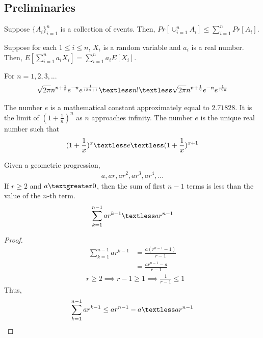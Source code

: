 \subsection{Preliminaries}
\begin{lemma}\label{union}
Suppose $\{A_i\}_{i=1}^n$ is a collection of events. Then, $Pr[\cup_{i=1}^{n}A_i]\le\sum_{i=1}^{n}Pr[A_i]$.
\end{lemma}
\begin{lemma}\label{linearity}
Suppose for each $1 \le i \le n$, $X_i$ is a random variable and $a_i$ is a real number. Then, $E[\sum_{i=1}^na_iX_i]=\sum_{i=1}^{n}a_iE[X_i]$.
\end{lemma}
\begin{lemma}\label{Stirling}
 For $n=1,2,3,...$
\begin{align}
    \nonumber \sqrt{2\pi}n^{n+\frac{1}{2}}e^{-n}e^{\frac{1}{12n+1}}\textless n! \textless \sqrt{2\pi}n^{n+\frac{1}{2}}e^{-n}e^{\frac{1}{12n}} 
\end{align}
\end{lemma}
\begin{definition}\label{e}
The number $e$ is a mathematical constant approximately equal to $2.71828$. It is the limit of $(1+\frac{1}{n})^n$ as $n$ approaches infinity. The number $e$ is the unique real number such that
\begin{align}
    \nonumber (1+\frac{1}{x})^{x} \textless e \textless (1+\frac{1}{x})^{x+1}
\end{align}
\end{definition}
\begin{lemma}\label{gp}
Given a geometric progression, 
\begin{align}
    \nonumber a, ar, ar^2, ar^3, ar^4, ...
\end{align}
If $r \ge 2$ and $a\textgreater 0$, then the sum of first $n-1$ terms is less than the value of the $n$-th term.
\begin{align}
    \nonumber \sum_{k=1}^{n-1}ar^{k-1} \textless ar^{n-1}
\end{align}
\end{lemma}
\begin{proof}
\begin{align}
    \nonumber \sum_{k=1}^{n-1}ar^{k-1}&=\frac{a(r^{n-1}-1)}{r-1}\\
    \nonumber &=\frac{ar^{n-1}-a}{r-1}
\end{align}
\begin{align}
    \nonumber &r\ge 2 \implies r-1 \ge 1 \implies \frac{1}{r-1} \le 1
\end{align}
Thus, 
\begin{align}
    \nonumber \sum_{k=1}^{n-1}ar^{k-1}\le ar^{n-1}-a \textless ar^{n-1}
\end{align} 
\end{proof}
